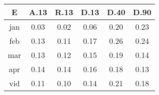 \begin{tabular}{ | c | c c c c c | }\hline
E	&A.13	&R.13	&D.13	&D.40	&D.90\\ \hline
jan		&0.03	&0.02	&0.06	&0.20	&0.23\\
feb		&0.13	&0.11	&0.17	&0.26	&0.24\\
mar		&0.13	&0.12	&0.15	&0.19	&0.14\\
apr		&0.14	&0.14	&0.16	&0.18	&0.13\\ \hline
vid		&0.11	&0.10	&0.14	&0.21	&0.18\\ \hline
\end{tabular}